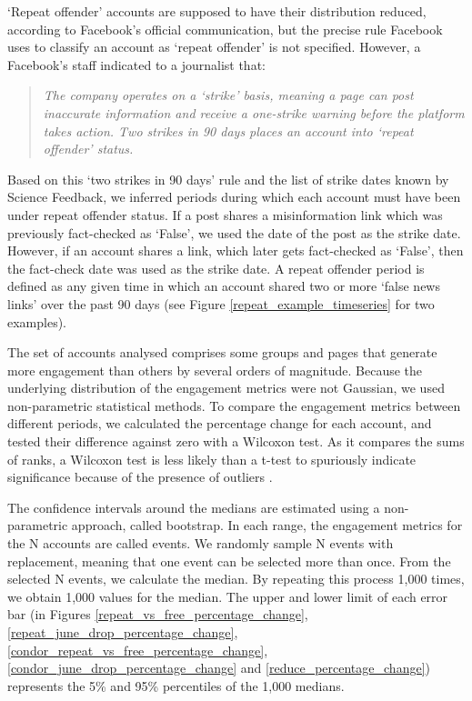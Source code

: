 \documentclass[review]{elsarticle}
\begin{document}
`Repeat offender' accounts are supposed to have their distribution reduced, according to Facebook's official communication, but the precise rule Facebook uses to classify an account as `repeat offender' is not specified. 
However, a Facebook’s staff indicated to a journalist \cite{2strikes90daysRule} that:
\begin{quote}
\emph{The company operates on a `strike' basis, meaning a page can post inaccurate information and receive a one-strike warning before the platform takes action. 
Two strikes in 90 days places an account into `repeat offender' status.}
\end{quote}

Based on this `two strikes in 90 days' rule and the list of strike dates known by Science Feedback, we inferred periods during which each account must have been under repeat offender status. 
If a post shares a misinformation link which was previously fact-checked as `False', we used the date of the post as the strike date. 
However, if an account shares a link, which later gets fact-checked as `False', then the fact-check date was used as the strike date. 
A repeat offender period is defined as any given time in which an account shared two or more `false news links' over the past 90 days (see Figure \ref{repeat_example_timeseries} for two examples).

The set of accounts analysed comprises some groups and pages that generate more engagement than others by several orders of magnitude. 
Because the underlying distribution of the engagement metrics were not Gaussian, we used non-parametric statistical methods. 
To compare the engagement metrics between different periods, we calculated the percentage change for each account, and tested their difference against zero with a Wilcoxon test.
As it compares the sums of ranks, a Wilcoxon test is less likely than a t-test to spuriously indicate significance because of the presence of outliers \cite{wilcoxon1992individual}.

The confidence intervals around the medians are estimated using a non-parametric approach, called bootstrap. 
In each range, the engagement metrics for the N accounts are called events. 
We randomly sample N events with replacement, meaning that one event can be selected more than once. 
From the selected N events, we calculate the median. 
By repeating this process 1,000 times, we obtain 1,000 values for the median. 
The upper and lower limit of each error bar (in Figures \ref{repeat_vs_free_percentage_change}, \ref{repeat_june_drop_percentage_change}, \ref{condor_repeat_vs_free_percentage_change}, \ref{condor_june_drop_percentage_change} and \ref{reduce_percentage_change}) represents the 5\% and 95\% percentiles of the 1,000 medians.
\end{document}
